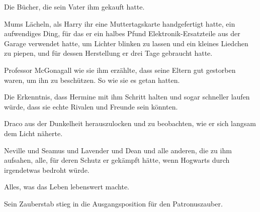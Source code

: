 Die Bücher, die sein Vater ihm gekauft hatte.

Mums Lächeln, als Harry ihr eine Muttertagskarte handgefertigt hatte, ein aufwendiges Ding, für das er ein halbes Pfund Elektronik-Ersatzteile aus der Garage verwendet hatte, um Lichter blinken zu lassen und ein kleines Liedchen zu piepen, und für dessen Herstellung er drei Tage gebraucht hatte.

Professor McGonagall wie sie ihm erzählte, dass seine Eltern gut gestorben waren, um ihn zu beschützen. So wie sie es getan hatten.

Die Erkenntnis, dass Hermine mit ihm Schritt halten und sogar schneller laufen würde, dass sie echte Rivalen und Freunde sein könnten.

Draco aus der Dunkelheit herauszulocken und zu beobachten, wie er sich langsam dem Licht näherte.

Neville und Seamus und Lavender und Dean und alle anderen, die zu ihm aufsahen, alle, für deren Schutz er gekämpft hätte, wenn Hogwarts durch irgendetwas bedroht würde.

Alles, was das Leben lebenswert machte.

Sein Zauberstab stieg in die Ausgangsposition für den Patronuszauber.

